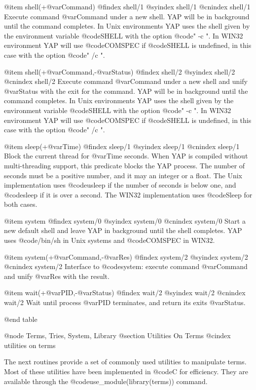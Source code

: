 @item shell(+@var{Command})
@findex  shell/1
@syindex shell/1
@cnindex shell/1
Execute command @var{Command} under a new shell. YAP will be in
background until the command completes. In Unix environments YAP uses
the shell given by the environment variable @code{SHELL} with the option
@code{" -c "}. In WIN32 environment YAP will use @code{COMSPEC} if
@code{SHELL} is undefined, in this case with the option @code{" /c "}.

@item shell(+@var{Command},-@var{Status})
@findex  shell/2
@syindex shell/2
@cnindex shell/2
Execute command @var{Command} under a new shell and unify @var{Status}
with the exit for the command. YAP will be in background until the
command completes. In Unix environments YAP uses the shell given by the
environment variable @code{SHELL} with the option @code{" -c "}. In
WIN32 environment YAP will use @code{COMSPEC} if @code{SHELL} is
undefined, in this case with the option @code{" /c "}.

@item sleep(+@var{Time})
@findex  sleep/1
@syindex sleep/1
@cnindex sleep/1
Block the current thread for @var{Time} seconds. When YAP is compiled 
without multi-threading support, this predicate blocks the YAP process. 
The number of seconds must be a positive number, and it may an integer 
or a float. The Unix implementation uses @code{usleep} if the number of 
seconds is below one, and @code{sleep} if it is over a second. The WIN32 
implementation uses @code{Sleep} for both cases.

@item system
@findex  system/0
@syindex system/0
@cnindex system/0
Start a new default shell and leave YAP in background until the shell
completes. YAP uses @code{/bin/sh} in Unix systems and @code{COMSPEC} in
WIN32.

@item system(+@var{Command},-@var{Res})
@findex  system/2
@syindex system/2
@cnindex system/2
Interface to @code{system}: execute command @var{Command} and unify
@var{Res} with the result.

@item wait(+@var{PID},-@var{Status})
@findex  wait/2
@syindex wait/2
@cnindex wait/2
Wait until process @var{PID} terminates, and return its exits @var{Status}.

@end table


@node Terms, Tries, System, Library
@section Utilities On Terms
@cindex utilities on terms

The next routines provide a set of commonly used utilities to manipulate
terms. Most of these utilities have been implemented in @code{C} for
efficiency. They are available through the
@code{use_module(library(terms))} command.

